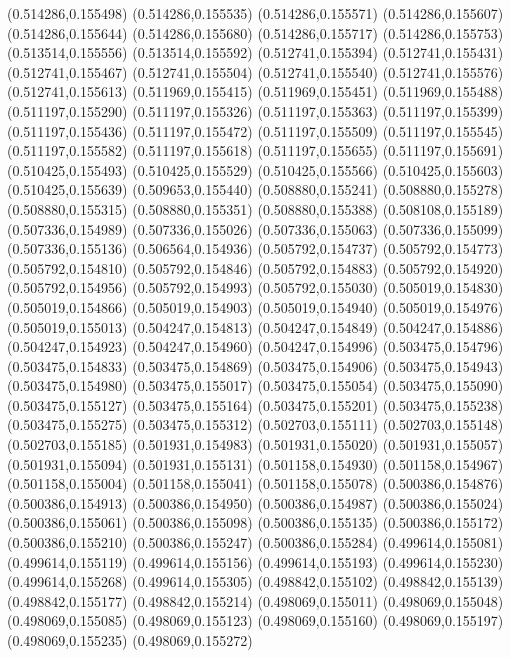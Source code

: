 (0.514286,0.155498)
(0.514286,0.155535)
(0.514286,0.155571)
(0.514286,0.155607)
(0.514286,0.155644)
(0.514286,0.155680)
(0.514286,0.155717)
(0.514286,0.155753)
(0.513514,0.155556)
(0.513514,0.155592)
(0.512741,0.155394)
(0.512741,0.155431)
(0.512741,0.155467)
(0.512741,0.155504)
(0.512741,0.155540)
(0.512741,0.155576)
(0.512741,0.155613)
(0.511969,0.155415)
(0.511969,0.155451)
(0.511969,0.155488)
(0.511197,0.155290)
(0.511197,0.155326)
(0.511197,0.155363)
(0.511197,0.155399)
(0.511197,0.155436)
(0.511197,0.155472)
(0.511197,0.155509)
(0.511197,0.155545)
(0.511197,0.155582)
(0.511197,0.155618)
(0.511197,0.155655)
(0.511197,0.155691)
(0.510425,0.155493)
(0.510425,0.155529)
(0.510425,0.155566)
(0.510425,0.155603)
(0.510425,0.155639)
(0.509653,0.155440)
(0.508880,0.155241)
(0.508880,0.155278)
(0.508880,0.155315)
(0.508880,0.155351)
(0.508880,0.155388)
(0.508108,0.155189)
(0.507336,0.154989)
(0.507336,0.155026)
(0.507336,0.155063)
(0.507336,0.155099)
(0.507336,0.155136)
(0.506564,0.154936)
(0.505792,0.154737)
(0.505792,0.154773)
(0.505792,0.154810)
(0.505792,0.154846)
(0.505792,0.154883)
(0.505792,0.154920)
(0.505792,0.154956)
(0.505792,0.154993)
(0.505792,0.155030)
(0.505019,0.154830)
(0.505019,0.154866)
(0.505019,0.154903)
(0.505019,0.154940)
(0.505019,0.154976)
(0.505019,0.155013)
(0.504247,0.154813)
(0.504247,0.154849)
(0.504247,0.154886)
(0.504247,0.154923)
(0.504247,0.154960)
(0.504247,0.154996)
(0.503475,0.154796)
(0.503475,0.154833)
(0.503475,0.154869)
(0.503475,0.154906)
(0.503475,0.154943)
(0.503475,0.154980)
(0.503475,0.155017)
(0.503475,0.155054)
(0.503475,0.155090)
(0.503475,0.155127)
(0.503475,0.155164)
(0.503475,0.155201)
(0.503475,0.155238)
(0.503475,0.155275)
(0.503475,0.155312)
(0.502703,0.155111)
(0.502703,0.155148)
(0.502703,0.155185)
(0.501931,0.154983)
(0.501931,0.155020)
(0.501931,0.155057)
(0.501931,0.155094)
(0.501931,0.155131)
(0.501158,0.154930)
(0.501158,0.154967)
(0.501158,0.155004)
(0.501158,0.155041)
(0.501158,0.155078)
(0.500386,0.154876)
(0.500386,0.154913)
(0.500386,0.154950)
(0.500386,0.154987)
(0.500386,0.155024)
(0.500386,0.155061)
(0.500386,0.155098)
(0.500386,0.155135)
(0.500386,0.155172)
(0.500386,0.155210)
(0.500386,0.155247)
(0.500386,0.155284)
(0.499614,0.155081)
(0.499614,0.155119)
(0.499614,0.155156)
(0.499614,0.155193)
(0.499614,0.155230)
(0.499614,0.155268)
(0.499614,0.155305)
(0.498842,0.155102)
(0.498842,0.155139)
(0.498842,0.155177)
(0.498842,0.155214)
(0.498069,0.155011)
(0.498069,0.155048)
(0.498069,0.155085)
(0.498069,0.155123)
(0.498069,0.155160)
(0.498069,0.155197)
(0.498069,0.155235)
(0.498069,0.155272)
